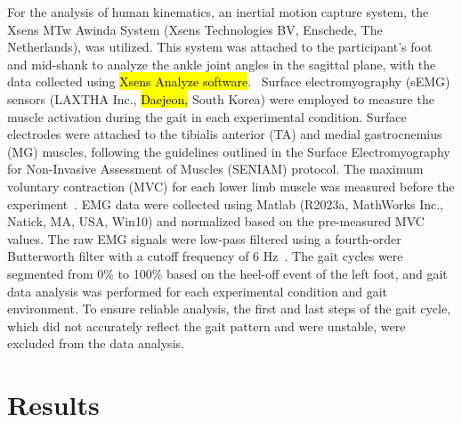 \documentclass[actuators,article,accept,pdftex,moreauthors]{Definitions/mdpi}
\begin{document}
For the analysis of human kinematics, an inertial motion capture system, the Xsens MTw Awinda System (Xsens Technologies BV, Enschede, The Netherlands), was utilized. This system was attached to the participant's foot and mid-shank to analyze the ankle joint angles in the sagittal plane, with the data collected using \hl{Xsens Analyze software}.%
~Surface electromyography (sEMG) sensors (LAXTHA Inc., \hl{Daejeon,} %
 South Korea) were employed to measure the muscle activation during the gait in each experimental {condition}. Surface electrodes were attached to the tibialis anterior (TA) and medial gastrocnemius (MG) muscles, following the guidelines outlined in the Surface Electromyography for Non-Invasive Assessment of Muscles (SENIAM) protocol. The maximum voluntary contraction (MVC) for each lower limb muscle was measured before the experiment~\cite{Allison1993,Burden2010}. EMG data were collected using Matlab (R2023a, MathWorks Inc., Natick, MA, USA, Win10) and normalized based on the pre-measured MVC values. The raw EMG signals were low-pass filtered using a fourth-order Butterworth filter with a cutoff frequency of 6 Hz~\cite{Roger2007}.
The gait cycles were segmented from 0\% to 100\% based on the heel-off event of the left foot, and gait data analysis was performed for each experimental condition and gait environment. To ensure reliable analysis, the first and last steps of the gait cycle, which did not accurately reflect the gait pattern and were unstable, were excluded from the data analysis.

\section{Results}
\end{document}
